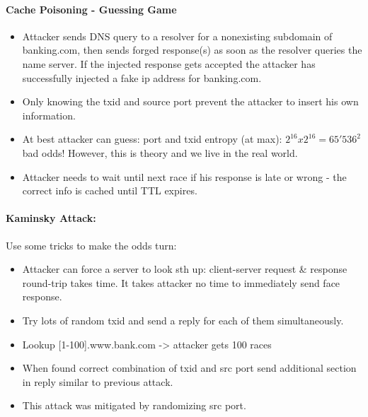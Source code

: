 \paragraph{Cache Poisoning - Guessing Game}
\begin{itemize}
    \item Attacker sends DNS query to a resolver for a nonexisting subdomain of banking.com, then sends forged response(s) as soon as the resolver queries the name server. If the injected response gets accepted the attacker has successfully injected a fake ip address for banking.com. 
    \item Only knowing the txid and source port prevent the attacker to insert his own information.
    \item At best attacker can guess: port and txid entropy (at max): $2^{16} x 2^{16} = 65'536^2$ bad odds!
    However, this is theory and we live in the real world.
    \item Attacker needs to wait until next race if his response is late or wrong - the correct info is cached until TTL expires.
\end{itemize}

\paragraph{Kaminsky Attack:} Use some tricks to make the odds turn: 
\begin{itemize}
    \item Attacker can force a server to look sth up: client-server request \& response round-trip takes time. It takes attacker no time to immediately send face response.
    \item Try lots of random txid and send a reply for each of them simultaneously.
    \item Lookup [1-100].www.bank.com -> attacker gets 100 races
    \item When found correct combination of txid and src port send additional section in reply similar to previous attack.
    \item This attack was mitigated by randomizing src port.
\end{itemize}


